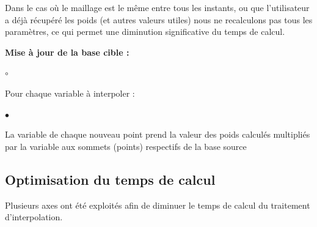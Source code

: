 \vspace{0.5cm}

\noindent Dans le cas où le maillage est le même entre tous les instants, ou que l'utilisateur a déjà récupéré les poids (et autres valeurs utiles) nous ne recalculons pas tous les paramètres, ce qui permet une diminution significative du temps de calcul.

\vspace{0.5cm}

\textbf{Mise à jour de la base cible :}
\begin{list}{$\circ$}{\leftmargin=0.5cm  \itemsep=0cm}
    \item Pour chaque variable à interpoler :
    \begin{list}{$\bullet$}{\leftmargin=0.5cm  \itemsep=0cm}
        \item La variable de chaque nouveau point prend la valeur des poids calculés multipliés par la variable aux sommets (points) respectifs de la base source
    \end{list}
\end{list}




\subsection{Optimisation du temps de calcul}

Plusieurs axes ont été exploités afin de diminuer le temps de calcul du traitement d'interpolation.

